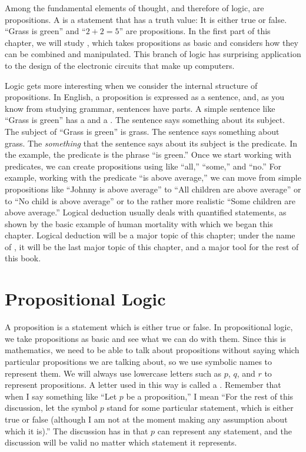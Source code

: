 Among the fundamental elements of thought, and therefore of logic, are
propositions.  A  is a statement that has a truth
value:  It is either true or false.
``Grass is green'' and ``$2 + 2 = 5$''
are propositions.  In the first part of this chapter, we will
study , which takes propositions as basic
and considers how they can be combined and manipulated.  This 
branch of logic has surprising application to the design of
the electronic circuits that make up computers.

Logic gets more interesting when we consider the internal
structure of propositions.  In English, a proposition is expressed as
a sentence, and, as you know from studying grammar, sentences have
parts.  A simple sentence like ``Grass is green'' has a
 and a .  The sentence says something
about its subject.  The subject of ``Grass is green'' is grass.
The sentence says something about grass.  The \emph{something}
that the sentence says about its subject is the predicate.
In the example, the predicate is the phrase ``is green.''
Once we start working with predicates, we can create propositions
using  like ``all,'' ``some,'' and ``no.''
For example, working with the predicate ``is above average,''
we can move from simple propositions like ``Johnny is above
average'' to ``All children are above average'' or to
``No child is above average'' or to the rather more realistic
``Some children are above average.''  Logical deduction usually
deals with quantified statements, as shown by the basic example of
human mortality with which we began this chapter.  Logical deduction
will be a major topic of this chapter;  under the name of
, it will be the last major topic of this chapter,
and a major tool for the
rest of this book.



\section{Propositional Logic}\label{S-logic-1}
A proposition
is a statement which is either true or false.
In propositional logic, we take propositions as basic and
see what we can do with them.  Since this is mathematics, we
need to be able to talk about propositions without saying
which particular propositions we are talking about, so we 
use symbolic names to represent them.  We will always use
lowercase letters such as $p$, $q$, and $r$ to represent
propositions.  A letter used in this way is called a
.  Remember that when I say
something like  ``Let $p$ be a proposition,'' I mean ``For the rest of
this discussion, let the symbol $p$ stand for some particular
statement, which is either true or false (although I am not
at the moment making any assumption about which it is).''
The discussion has  in that
$p$ can represent any statement, and the discussion will be
valid no matter which statement it represents.

